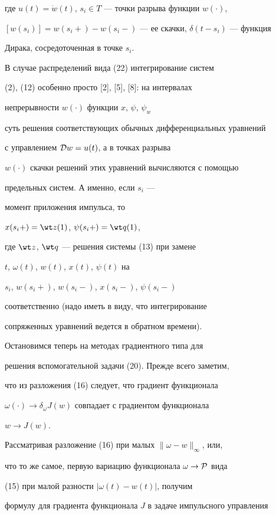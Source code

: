 где $u(t)=\Dot w(t)$, $s_i \in T$ --- точки разрыва функции $w(\cdot)$,


$[w(s_i)]=w(s_i+)-w(s_i-)$ --- ее скачки, $\delta(t-s_i)$ --- функция 


Дирака, сосредоточенная в точке $s_i$.





В случае распределений вида (22) интегрирование систем


(2), (12) особенно просто [2], [5], [8]: на интервалах 


непрерывности $w(\cdot)$ функции $x$, $\psi$, $\psi_w$ 


суть решения соответствующих обычных дифференциальных уравнений 


с управлением ${\cal D} w = u(t)$, а в точках разрыва


$w(\cdot)$ скачки решений этих уравнений вычисляются с помощью 


предельных систем. А именно, если $s_i$ ---


момент приложения импульса, то


$x(s_i+)= \wt z(1)$, $\psi(s_i+)=\wt q(1)$,


где $\wt z$, $\wt q$ --- решения системы (13) при замене


$t$, $\omega(t)$, $w(t)$, $x(t)$, $\psi(t)$ на 


$s_i$, $w(s_i+)$, $w(s_i-)$, $x(s_i-)$, $\psi(s_i-)$ 


соответственно (надо иметь в виду, что интегрирование 


сопряженных уравнений ведется в обратном времени).





Остановимся теперь на методах градиентного типа для


решения вспомогательной задачи (20). Прежде всего заметим,


что из разложения (16) следует, что градиент функционала


$\omega(\cdot) \to \delta_\omega J(w)$ совпадает с градиентом функционала 


$w \to J(w)$. 


Рассматривая разложение (16) при малых $\| \omega -w\|_\infty$, или,


что то же самое, первую вариацию функционала $\omega \to {\cal P}$ вида


(15) при малой разности $|\omega(t)-w(t)|$, получим


формулу для градиента функционала $J$ в задаче импульсного управления


